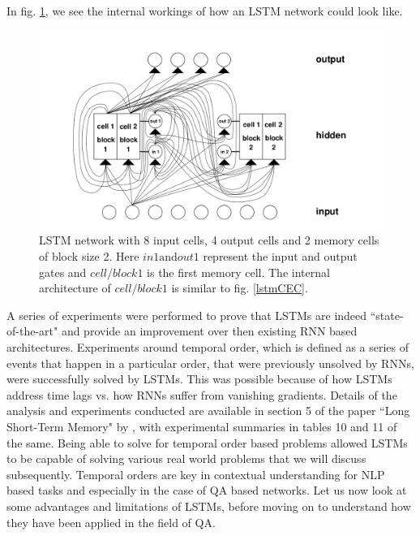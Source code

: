 \documentclass[a4paper,12pt]{report}
\begin{document}
            In fig. \ref{lstmNetwork}, we see the internal workings of how an LSTM network could look like.
            \begin{figure}[!h]
	           \centering
               \includegraphics[scale=0.35]{../images/lstm-network.png}
      		   \caption{LSTM network with 8 input cells, 4 output cells and 2 memory cells of block size 2. Here $ in1 \text{and} out1 $ represent the input and output gates and $ cell/block1 $ is the first memory cell. The internal architecture of $ cell/block1 $ is similar to fig. \ref{lstmCEC}. \citep{lstmoriginal}}\label{lstmNetwork}
            \end{figure}

            A series of experiments were performed to prove that LSTMs are indeed ``state-of-the-art" and provide an improvement over then existing RNN based architectures.
            Experiments around temporal order, which is defined as a series of events that happen in a particular order, that were previously unsolved by RNNs, were successfully solved by LSTMs. This was possible because of how LSTMs address time lags vs. how RNNs suffer from vanishing gradients. Details of the analysis and experiments conducted are available in section 5 of the paper ``Long Short-Term Memory" by \citep{lstmoriginal}, with experimental summaries in tables 10 and 11 of the same. Being able to solve for temporal order based problems allowed LSTMs to be capable of solving various real world problems that we will discuss subsequently.
            Temporal orders are key in contextual understanding for NLP based tasks and especially in the case of QA based networks. Let us now look at some advantages and limitations of LSTMs, before moving on to understand how they have been applied in the field of QA.
\end{document}

